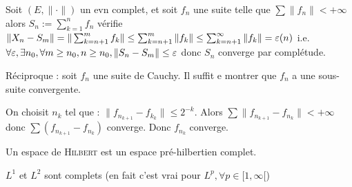 \documentclass[10pt,a4paper,notitlepage ]{report}
\begin{document}
\begin{demo}
	Soit $(E,\|\cdot\|)$ un evn complet, et soit $f_n$ une suite telle que $\sum\|f_n\| < + \infty$ alors $S_n := \sum_{k=1}^n f_n$ vérifie $\|X_n-S_m\| = \|\sum_{k=n+1}^m f_k\| \le \sum_{k=n+1}^m \|f_k\| \le \sum_{k=n+1}^\infty \|f_k\| = \varepsilon(n)$ i.e. $\forall \varepsilon, \exists n_0, \forall m\ge n_0, n\ge n_0, \|S_n-S_m\| \le \varepsilon$ donc $S_n$ converge par complétude.
	
	Réciproque : soit $f_n$ une suite de Cauchy. Il suffit e montrer que $f_n$ a une sous-suite convergente.
	
	On choisit $n_k$ tel que : $\|f_{n_{k+1}}-f_{k_k}\|\le 2^{-k}$. Alors $\sum \|f_{n_{k+1}} - f_{n_k}\| < + \infty$ donc $\sum(f_{n_{k+1}} - f_{n_k})$ converge. Donc $f_{n_k}$ converge.
\end{demo}

\begin{definition}
	Un espace de \textsc{Hilbert} est un espace pré-hilbertien complet.
\end{definition}

\begin{theorem}
	$L^1$ et $L^2$ sont complets (en fait c'est vrai pour $L^p, \forall p\in [1,\infty[$)
\end{theorem}
\end{document}
